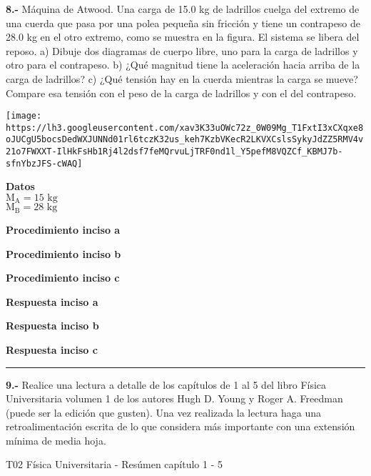 \documentclass[
]{article}
\begin{document}
\textbf{8.-} Máquina de Atwood. Una carga de 15.0 kg de ladrillos cuelga
del extremo de una cuerda que pasa por una polea pequeña sin fricción y
tiene un contrapeso de 28.0 kg en el otro extremo, como se muestra en la
figura. El sistema se libera del reposo. a) Dibuje dos diagramas de
cuerpo libre, uno para la carga de ladrillos y otro para el contrapeso.
b) ¿Qué magnitud tiene la aceleración hacia arriba de la carga de
ladrillos? c) ¿Qué tensión hay en la cuerda mientras la carga se mueve?
Compare esa tensión con el peso de la carga de ladrillos y con el del
contrapeso.

\texttt{[image: https://lh3.googleusercontent.com/xav3K33uOWc72z\_0W09Mg\_T1FxtI3xCXqxe8oJUCgU5bocsDedWXJUNNd01rl6tczK32us\_keh7KzbVKecR2LKVXCslsSykyJdZZ5RMV4v21o7FWXXT-IlHkFsHb1Rj4l2dsf7feMQrvuLjTRF0nd1l\_Y5pefM8VQZCf\_KBMJ7b-sfnYbzJFS-cWAQ]}

\textbf{Datos}\\
{\(\text{M}_{\text{A}} = 15\text{~kg}\)}\\
{\(\text{M}_{\text{B}} = 28\text{~kg}\)}

\textbf{Procedimiento inciso a}

\textbf{Procedimiento inciso b}

\textbf{Procedimiento inciso c}

\textbf{Respuesta inciso a}

\textbf{Respuesta inciso b}

\textbf{Respuesta inciso c}

\begin{center}\rule{0.5\linewidth}{0.5pt}\end{center}

\textbf{9.-} Realice una lectura a detalle de los capítulos de 1 al 5
del libro Física Universitaria volumen 1 de los autores Hugh D. Young y
Roger A. Freedman (puede ser la edición que gusten). Una vez realizada
la lectura haga una retroalimentación escrita de lo que considera más
importante con una extensión mínima de media hoja.

T02 Física Universitaria - Resúmen capítulo 1 - 5
\end{document}
